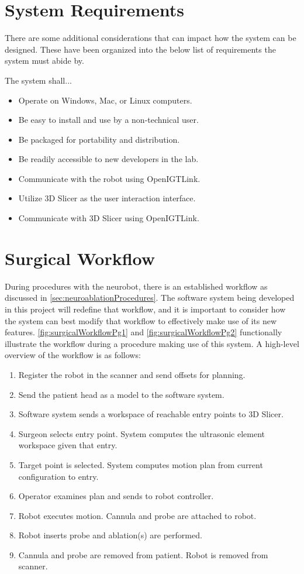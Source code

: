 \documentclass[12pt]{report}
\begin{document}
\section{System Requirements}
There are some additional considerations that can impact how the system can be designed. These have been organized into the below list of requirements the system must abide by.

The system shall...
\begin{itemize}
\singlespacing
\item Operate on Windows, Mac, or Linux computers.
\item Be easy to install and use by a non-technical user.
\item Be packaged for portability and distribution.
\item Be readily accessible to new developers in the lab.
\item Communicate with the robot using OpenIGTLink.
\item Utilize 3D Slicer as the user interaction interface.
\item Communicate with 3D Slicer using OpenIGTLink.
\end{itemize}


\section{Surgical Workflow}
\label{sec:surgicalWorkflow}
During procedures with the neurobot, there is an established workflow as discussed in \autoref{sec:neuroablationProcedures}. The software system being developed in this project will redefine that workflow, and it is important to consider how the system can best modify that workflow to effectively make use of its new features. \autoref{fig:surgicalWorkflowPg1} and \autoref{fig:surgicalWorkflowPg2} functionally illustrate the workflow during a procedure making use of this system. A high-level overview of the workflow is as follows:

\begin{enumerate}
\item Register the robot in the scanner and send offsets for planning.
\item Send the patient head as a model to the software system.
\item Software system sends a workspace of reachable entry points to 3D Slicer.
\item Surgeon selects entry point. System computes the ultrasonic element workspace given that entry.
\item Target point is selected. System computes motion plan from current configuration to entry.
\item Operator examines plan and sends to robot controller.
\item Robot executes motion. Cannula and probe are attached to robot. 
\item Robot inserts probe and ablation(s) are performed. 
\item Cannula and probe are removed from patient. Robot is removed from scanner.
\end{enumerate}
\end{document}
